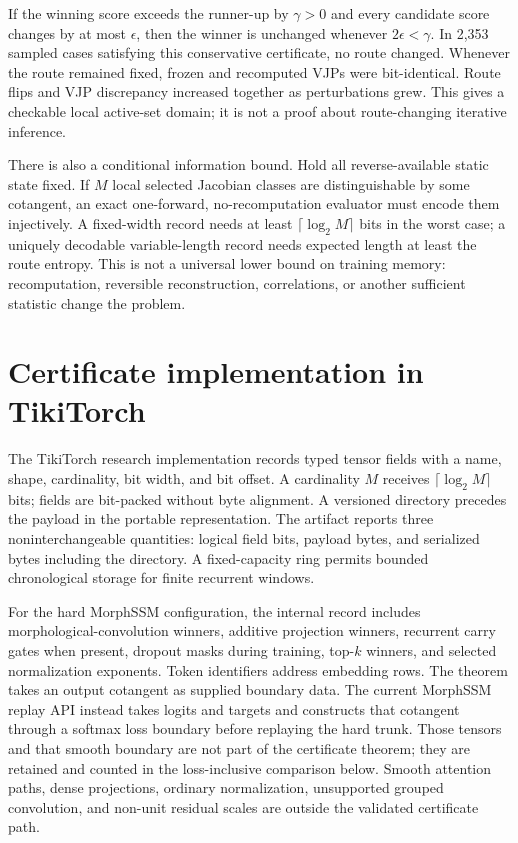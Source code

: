 \documentclass[10pt]{article}
\begin{document}
If the winning score exceeds the runner-up by $\gamma>0$ and every candidate
score changes by at most $\epsilon$, then the winner is unchanged whenever
$2\epsilon<\gamma$.  In 2,353 sampled cases satisfying this conservative
certificate, no route changed.  Whenever the route remained fixed, frozen and
recomputed VJPs were bit-identical.  Route flips and VJP discrepancy increased
together as perturbations grew.  This gives a checkable local active-set
domain; it is not a proof about route-changing iterative inference.

There is also a conditional information bound.  Hold all reverse-available
static state fixed.  If $M$ local selected Jacobian classes are distinguishable
by some cotangent, an exact one-forward, no-recomputation evaluator must encode
them injectively.  A fixed-width record needs at least
$\lceil\log_2M\rceil$ bits in the worst case; a uniquely decodable
variable-length record needs expected length at least the route entropy.  This
is not a universal lower bound on training memory: recomputation, reversible
reconstruction, correlations, or another sufficient statistic change the
problem.

\section{Certificate implementation in TikiTorch}

The TikiTorch research implementation records typed tensor fields with a name,
shape, cardinality, bit width, and bit offset.  A cardinality $M$ receives
$\lceil\log_2M\rceil$ bits; fields are bit-packed without byte alignment.  A
versioned directory precedes the payload in the portable representation.  The
artifact reports three noninterchangeable quantities: logical field bits,
payload bytes, and serialized bytes including the directory.  A fixed-capacity
ring permits bounded chronological storage for finite recurrent windows.

For the hard MorphSSM configuration, the internal record includes
morphological-convolution winners, additive projection winners, recurrent
carry gates when present, dropout masks during training, top-$k$ winners, and
selected normalization exponents.  Token identifiers address embedding rows.
The theorem takes an output cotangent as supplied boundary data.  The current
MorphSSM replay API instead takes logits and targets and constructs that
cotangent through a softmax loss boundary before replaying the hard trunk.
Those tensors and that smooth boundary are not part of the certificate theorem;
they are retained and counted in the loss-inclusive comparison below.  Smooth
attention paths, dense projections, ordinary normalization, unsupported grouped
convolution, and non-unit residual scales are outside the validated certificate
path.
\end{document}
